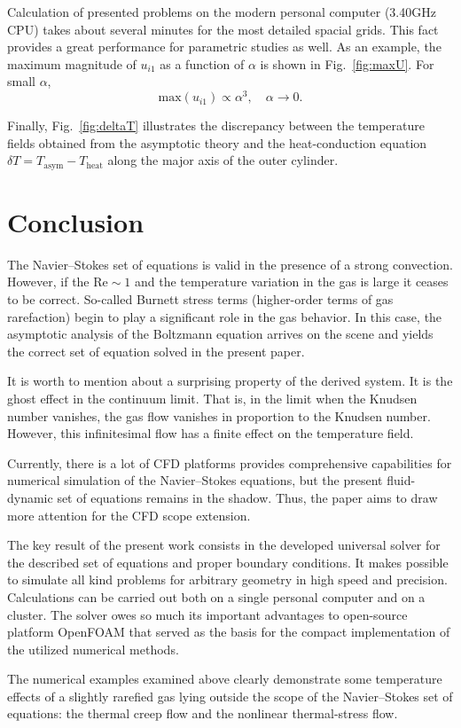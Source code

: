 \documentclass[smallextended, referee]{svjour3} %
\begin{document}
Calculation of presented problems on the modern personal computer (3.40GHz CPU)
takes about several minutes for the most detailed spacial grids.
This fact provides a great performance for parametric studies as well. As an example,
the maximum magnitude of \(u_{i1}\) as a function of \(\alpha\) is shown in Fig.~\ref{fig:maxU}.
For small \(\alpha\),
\begin{equation}
	\mathrm{max}(u_{i1}) \propto \alpha^3, \quad \alpha\to0.
\end{equation}

Finally, Fig.~\ref{fig:deltaT} illustrates the discrepancy between the temperature fields
obtained from the asymptotic theory and the heat-conduction equation
\( \delta T = T_\mathrm{asym} - T_\mathrm{heat} \)
along the major axis of the outer cylinder.

\section{Conclusion}

The Navier--Stokes set of equations is valid in the presence of a strong convection.
However, if the \(\mathrm{Re} \sim 1\) and the temperature variation in the gas is large
it ceases to be correct. So-called Burnett stress terms (higher-order terms of gas rarefaction)
begin to play a significant role in the gas behavior.
In this case, the asymptotic analysis of the Boltzmann equation arrives on the scene and yields
the correct set of equation solved in the present paper.

It is worth to mention about a surprising property of the derived system. It is the ghost effect
in the continuum limit. That is, in the limit when the Knudsen number vanishes,
the gas flow vanishes in proportion to the Knudsen number. However, this infinitesimal flow
has a finite effect on the temperature field.

Currently, there is a lot of CFD platforms provides comprehensive capabilities for
numerical simulation of the Navier--Stokes equations, but the present fluid-dynamic
set of equations remains in the shadow. Thus, the paper aims to
draw more attention for the CFD scope extension.

The key result of the present work consists in the developed universal solver for
the described set of equations and proper boundary conditions. It makes possible to
simulate all kind problems for arbitrary geometry in high speed and precision.
Calculations can be carried out both on a single personal computer and on a cluster.
The solver owes so much its important advantages to open-source platform OpenFOAM\textregistered{}
that served as the basis for the compact implementation of the utilized numerical methods.

The numerical examples examined above clearly demonstrate some temperature effects of
a slightly rarefied gas lying outside the scope of the Navier--Stokes set of equations:
the thermal creep flow and the nonlinear thermal-stress flow.


\end{document}
